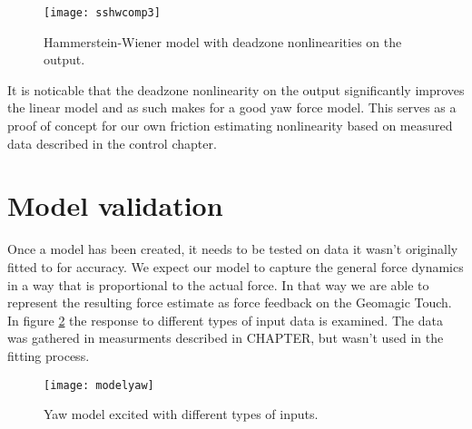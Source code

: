 \begin{figure}[H]
\centering
\hspace{-2.5em}\texttt{[image: sshwcomp3]}
\caption{Hammerstein-Wiener model with deadzone nonlinearities on the output.}
\label{fig:2LMI2}
\end{figure}

It is noticable that the deadzone nonlinearity on the output significantly improves the linear model and as such makes for a good yaw force model.
This serves as a proof of concept for our own friction estimating nonlinearity based on measured data described in the control chapter.

\section{Model validation}
Once a model has been created, it needs to be tested on data it wasn't originally fitted to for accuracy.
We expect our model to capture the general force dynamics in a way that is proportional to the actual force.
In that way we are able to represent the resulting force estimate as force feedback on the Geomagic Touch.
In figure \ref{fig:final_res} the response to different types of input data is examined.
The data was gathered in measurments described in CHAPTER, but wasn't used in the fitting process.

\begin{figure}[H]
\centering
\texttt{[image: modelyaw]}
\caption{Yaw model excited with different types of inputs.}
\label{fig:final_res}
\end{figure}

